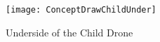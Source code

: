 \documentclass[paper=a4, fontsize=12pt]{scrartcl}
\begin{document}
\begin{figure}[h]
	\centering
	\texttt{[image: ConceptDrawChildUnder]}
	\caption{Underside of the Child Drone}
	\label{fig:childunderside}
\end{figure}





\end{document}
